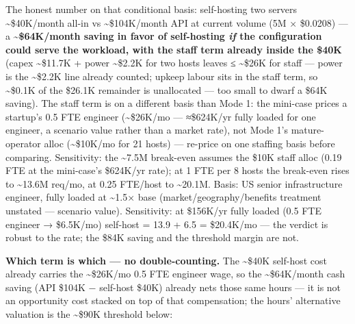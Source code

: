 The honest number on that conditional basis: self-hosting two servers
\textasciitilde\$40K/month all-in vs \textasciitilde\$104K/month API at
current volume (5M × \$0.0208) --- a \textbf{\textasciitilde\$64K/month
saving in favor of self-hosting \emph{if} the configuration could serve
the workload, with the staff term already inside the \$40K} (capex
\textasciitilde\$11.7K + power \textasciitilde\$2.2K for two hosts
leaves ≤ \textasciitilde\$26K for staff --- power is the
\textasciitilde\$2.2K line already counted; upkeep labour sits in the
staff term, so \textasciitilde\$0.1K of the \$26.1K remainder is
unallocated --- too small to dwarf a \$64K saving). The staff term is on
a different basis than Mode 1: the mini-case prices a startup's 0.5 FTE
engineer (\textasciitilde\$26K/mo --- ≈\$624K/yr fully loaded for one
engineer, a scenario value rather than a market rate), not Mode 1's
mature-operator alloc (\textasciitilde\$10K/mo for 21 hosts) ---
re-price on one staffing basis before comparing. Sensitivity: the
\textasciitilde7.5M break-even assumes the \$10K staff alloc (0.19 FTE
at the mini-case's \$624K/yr rate); at 1 FTE per 8 hosts the break-even
rises to \textasciitilde13.6M req/mo, at 0.25 FTE/host to
\textasciitilde20.1M. Basis: US senior infrastructure engineer, fully
loaded at \textasciitilde1.5× base (market/geography/benefits treatment
unstated --- scenario value). Sensitivity: at \$156K/yr fully loaded
(0.5 FTE engineer → \$6.5K/mo) self-host = 13.9 + 6.5 = \$20.4K/mo ---
the verdict is robust to the rate; the \$84K saving and the threshold
margin are not.

\textbf{Which term is which --- no double-counting.} The
\textasciitilde\$40K self-host cost already carries the
\textasciitilde\$26K/mo 0.5 FTE engineer wage, so the
\textasciitilde\$64K/month cash saving (API \$104K − self-host \$40K)
already nets those same hours --- it is not an opportunity cost stacked
on top of that compensation; the hours' alternative valuation is the
\textasciitilde\$90K threshold below:

